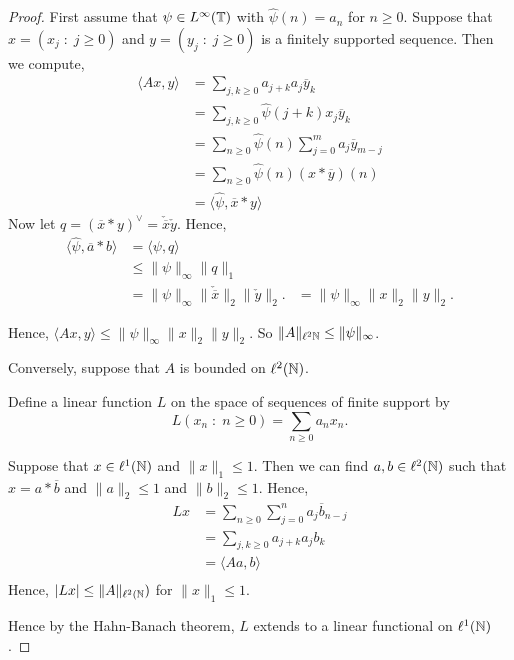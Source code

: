 \documentclass{unswmaths}
\begin{document}
    \begin{proof}
        First assume that $\psi \in L^\infty(\mathbb{T})$ with $\hat{\psi}(n) = a_n$ for $n\geq 0$.
        Suppose that $x = (x_j\;:\;j\geq 0)$ and $y = (y_j\;:\;j\geq 0)$ is a finitely supported sequence. 
        Then we compute,
        \begin{align*}
            \langle Ax,y \rangle &= \sum_{j,k\geq 0} a_{j+k}a_j\overline{y}_k\\
            &= \sum_{j,k\geq 0} \hat{\psi}(j+k)x_j\overline{y}_k\\
            &= \sum_{n \geq 0} \hat{\psi}(n)\sum_{j = 0}^m a_j\overline{y}_{m-j}\\
            &= \sum_{n\geq 0} \hat{\psi}(n) (x * \overline{y})(n)\\
            &= \langle \hat{\psi},\overline{x}*y\rangle
        \end{align*}
        Now let $q = (\overline{x}*y)^{\vee} = \check{\overline{x}} \check{y}$. Hence,
        \begin{align*}
            \langle \hat{\psi},\overline{a}*b\rangle &= \langle \psi,q\rangle\\
            &\leq \|\psi\|_{\infty} \|q\|_1\\
            &= \|\psi\|_\infty \|\check{\overline{x}}\|_2\|\check{y}\|_2.
            &= \|\psi\|_\infty \|{x}\|_2\|y\|_2.
        \end{align*}
        
        Hence, $\langle Ax,y\rangle \leq \|\psi\|_\infty \|x\|_2\|y\|_2$. So $\|A\|_{\ell^2{\mathbb{N}}} \leq \|\psi\|_\infty$.
        
        Conversely, suppose that $A$ is bounded on $\ell^2(\mathbb{N})$. 
        
        Define a linear function $L$ on the space of sequences of finite support by
        \begin{equation*}
            L(x_n\;:\;n \geq 0) = \sum_{n\geq 0}a_nx_n.
        \end{equation*}
        
        Suppose that $x \in \ell^1(\mathbb{N})$ and $\|x\|_1\leq 1$. Then
        we can find $a,b\in \ell^2(\mathbb{N})$ such that $x = a*\overline{b}$
        and $\|a\|_2 \leq 1$ and $\|b\|_2\leq 1$.
        Hence,
        \begin{align*}
            Lx &= \sum_{n\geq 0}\sum_{j=0}^n a_j\overline{b}_{n-j}\\
            &= \sum_{j,k\geq 0}a_{j+k} a_j b_k\\
            &= \langle Aa,b\rangle\\
        \end{align*}
        Hence, $|Lx| \leq \|A\|_{\ell^2(\mathbb{N}})$ for $\|x\|_1 \leq 1$.
        
        Hence by the Hahn-Banach theorem, $L$ extends to a linear functional
        on $\ell^1(\mathbb{N})$.
        
        
        
        
    \end{proof}
    

    

    
\end{document}
